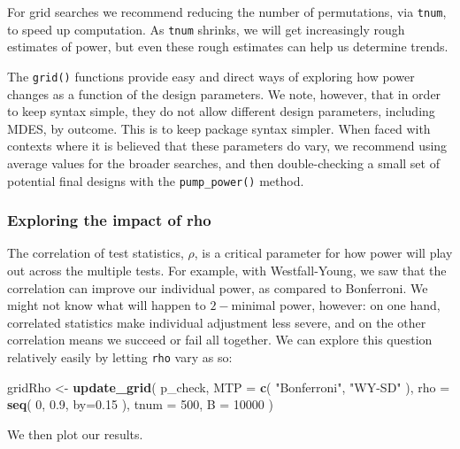 \documentclass[
]{article}
\newenvironment{Shaded}{\begin{snugshade}}{\end{snugshade}}
\newcommand{\DataTypeTok}[1]{\textcolor[rgb]{0.13,0.29,0.53}{#1}}
\newcommand{\DecValTok}[1]{\textcolor[rgb]{0.00,0.00,0.81}{#1}}
\newcommand{\FloatTok}[1]{\textcolor[rgb]{0.00,0.00,0.81}{#1}}
\newcommand{\KeywordTok}[1]{\textcolor[rgb]{0.13,0.29,0.53}{\textbf{#1}}}
\newcommand{\NormalTok}[1]{#1}
\newcommand{\StringTok}[1]{\textcolor[rgb]{0.31,0.60,0.02}{#1}}
\begin{document}
For grid searches we recommend reducing the number of permutations, via
\texttt{tnum}, to speed up computation. As \texttt{tnum} shrinks, we
will get increasingly rough estimates of power, but even these rough
estimates can help us determine trends.

The \texttt{grid()} functions provide easy and direct ways of exploring
how power changes as a function of the design parameters. We note,
however, that in order to keep syntax simple, they do not allow
different design parameters, including MDES, by outcome. This is to keep
package syntax simpler. When faced with contexts where it is believed
that these parameters do vary, we recommend using average values for the
broader searches, and then double-checking a small set of potential
final designs with the \texttt{pump\_power()} method.

\subsubsection{Exploring the impact of rho}

The correlation of test statistics, \(\rho\), is a critical parameter
for how power will play out across the multiple tests. For example, with
Westfall-Young, we saw that the correlation can improve our individual
power, as compared to Bonferroni. We might not know what will happen to
\(2-\)minimal power, however: on one hand, correlated statistics make
individual adjustment less severe, and on the other correlation means we
succeed or fail all together. We can explore this question relatively
easily by letting \texttt{rho} vary as so:

\begin{Shaded}
\begin{Highlighting}[]
\NormalTok{gridRho \textless{}{-}}\StringTok{ }\KeywordTok{update\_grid}\NormalTok{( p\_check,}
            \DataTypeTok{MTP =} \KeywordTok{c}\NormalTok{( }\StringTok{"Bonferroni"}\NormalTok{, }\StringTok{"WY{-}SD"}\NormalTok{ ),}
            \DataTypeTok{rho =} \KeywordTok{seq}\NormalTok{( }\DecValTok{0}\NormalTok{, }\FloatTok{0.9}\NormalTok{, }\DataTypeTok{by=}\FloatTok{0.15}\NormalTok{ ),}
            \DataTypeTok{tnum =} \DecValTok{500}\NormalTok{,}
            \DataTypeTok{B =} \DecValTok{10000}\NormalTok{ )}
\end{Highlighting}
\end{Shaded}

We then plot our results.
\end{document}
